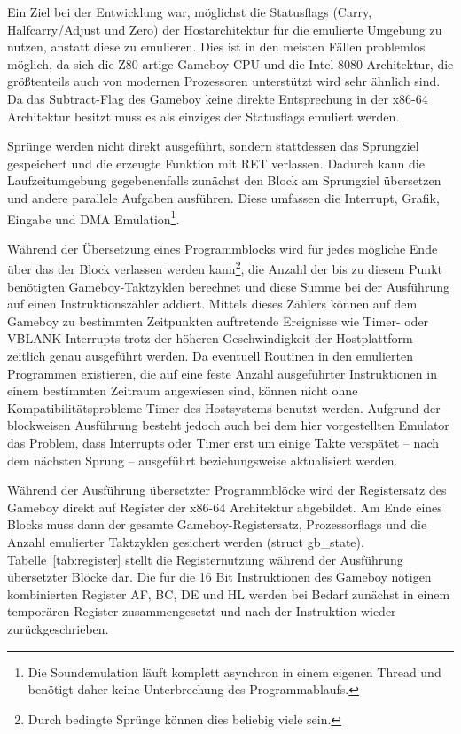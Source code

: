 \documentclass[a4paper]{scrartcl}
\begin{document}
Ein Ziel bei der Entwicklung war, möglichst die Statusflags (Carry, Halfcarry/Adjust und Zero) der Hostarchitektur für die emulierte Umgebung zu nutzen, anstatt diese zu emulieren. Dies ist in den meisten Fällen problemlos möglich, da sich die Z80-artige Gameboy CPU und die Intel 8080-Architektur, die größtenteils auch von modernen Prozessoren unterstützt wird sehr ähnlich sind. Da das Subtract-Flag des Gameboy keine direkte Entsprechung in der x86-64 Architektur besitzt muss es als einziges der Statusflags emuliert werden.

Sprünge werden nicht direkt ausgeführt, sondern stattdessen das Sprungziel gespeichert und die erzeugte Funktion mit RET verlassen. Dadurch kann die Laufzeitumgebung gegebenenfalls zunächst den Block am Sprungziel übersetzen und andere parallele Aufgaben ausführen. Diese umfassen die Interrupt, Grafik, Eingabe und DMA Emulation\footnote{Die Soundemulation läuft komplett asynchron in einem eigenen Thread und benötigt daher keine Unterbrechung des Programmablaufs.}.

Während der Übersetzung eines Programmblocks wird für jedes mögliche Ende über das der Block verlassen werden kann\footnote{Durch bedingte Sprünge können dies beliebig viele sein.}, die Anzahl der bis zu diesem Punkt benötigten Gameboy-Taktzyklen berechnet und diese Summe bei der Ausführung auf einen Instruktionszähler addiert. Mittels dieses Zählers können auf dem Gameboy zu bestimmten Zeitpunkten auftretende Ereignisse wie Timer- oder VBLANK-Interrupts trotz der höheren Geschwindigkeit der Hostplattform zeitlich genau ausgeführt werden. Da eventuell Routinen in den emulierten Programmen existieren, die auf eine feste Anzahl ausgeführter Instruktionen in einem bestimmten Zeitraum angewiesen sind, können nicht ohne Kompatibilitätsprobleme Timer des Hostsystems benutzt werden. Aufgrund der blockweisen Ausführung besteht jedoch auch bei dem hier vorgestellten Emulator das Problem, dass Interrupts oder Timer erst um einige Takte verspätet -- nach dem nächsten Sprung -- ausgeführt beziehungsweise aktualisiert werden.

Während der Ausführung übersetzter Programmblöcke wird der Registersatz des Gameboy direkt auf Register der x86-64 Architektur abgebildet. Am Ende eines Blocks muss dann der gesamte Gameboy-Registersatz, Prozessorflags und die Anzahl emulierter Taktzyklen gesichert werden (struct gb\_state). Tabelle~\ref{tab:register} stellt die Registernutzung während der Ausführung übersetzter Blöcke dar. Die für die 16 Bit Instruktionen des Gameboy nötigen kombinierten Register AF, BC, DE und HL werden bei Bedarf zunächst in einem temporären Register zusammengesetzt und nach der Instruktion wieder zurückgeschrieben.
\end{document}
